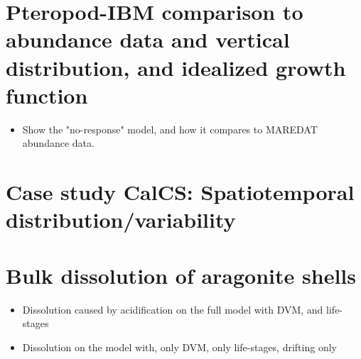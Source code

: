 
\section{Pteropod-IBM comparison to abundance data and vertical distribution, and idealized growth function}
\begin{itemize}
    \item Show the "no-response" model, and how it compares to MAREDAT abundance data.
\end{itemize}
\section{Case study CalCS: Spatiotemporal distribution/variability}

\section{Bulk dissolution of aragonite shells}
\begin{itemize}
    \item Dissolution caused by acidification on the full model with DVM, and life-stages
    \item Dissolution on the model with, only DVM, only life-stages, drifting only
\end{itemize}{}









